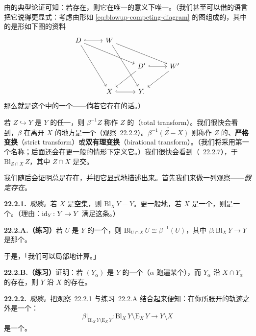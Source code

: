 由\trUniversalProperty{}的典型论证可知：若\trBlowup{}存在，则它在唯一\trIsomorphism{}的意义下唯一。（我们甚至可以借\trYonedaLemma{}的语言把它说得更显式：考虑由形如 \eqref{eq:blowup-competing-diagram} 的图组成的\trCategory，其中的\trMorphism{}是形如下图的资料
\[
\begin{tikzcd}[row sep=2.3em, column sep=2.7em]
D \ar[r,hook] \ar[drr] \ar[ddr] & W \ar[drr] \ar[ddr] & & \\
& & D' \ar[r,hook] \ar[dl] & W' \ar[dl] \\
& X \ar[r,hook] & Y. &
\end{tikzcd}
\]
那么\trBlowup{}就是这个\trCategory{}中的一个\trFinalObject——倘若它存在的话。）

若 $Z\hookrightarrow Y$ 是 $Y$ 的任一\trClosedSubscheme，则\trSchemeTheoreticPreimage{} $\beta^{-1}Z$ 称作 $Z$ 的\textbf{\trTotalTransform}（total transform）。我们很快会看到，$\beta$ 在离开 $X$ 的地方是一个\trIsomorphism（\mbox{观察~22.2.2}）。$\overline{\beta^{-1}(Z-X)}$ 则称作 $Z$ 的\textbf{\trProperTransform}、\textbf{严格变换}（strict transform）或\textbf{双有理变换}（birational transform）。（我们将采用第一个名称；后面还会在更一般的情形下定义它。）我们很快会看到（\mbox{\trBlowupClosureLemma~22.2.7}），\trProperTransform{}\trNaturalIsomorphism{}于 $\mathrm{Bl}_{Z\cap X}\,Z$，其中 $Z\cap X$ 是\trSchemeTheoretic{}交。

我们随后会证明\trBlowup{}总是存在，并把它显式地描述出来。首先我们来做一列观察——\emph{假定\trBlowup{}存在}。

\textbf{22.2.1.}\ \emph{观察。}\quad 若 $X$ 是空集，则 $\mathrm{Bl}_X\,Y=Y$。更一般地，若 $X$ 是一个\trEffectiveCartierDivisor，则\trBlowup{}是一个\trIsomorphism。（理由：$\mathrm{id}_Y\colon Y\to Y$ 满足这条\trUniversalProperty。）

\textbf{22.2.A.（练习）}\quad 若 $U$ 是 $Y$ 的一个\trOpenSubset，则 $\mathrm{Bl}_{U\cap X}\,U\cong\beta^{-1}(U)$，其中 $\beta\colon\mathrm{Bl}_X\,Y\to Y$ 是那个\trBlowup。

于是，「我们可以局部地计算\trBlowup。」

\textbf{22.2.B.（练习）}\quad 证明：若 $(Y_\alpha)$ 是 $Y$ 的一个\trOpenCover（$\alpha$ 跑遍某个\trIndexSet），而 $Y_\alpha$ 沿 $X\cap Y_\alpha$ 的\trBlowup{}存在，则 $Y$ 沿 $X$ 的\trBlowup{}存在。

\textbf{22.2.2.}\ \emph{观察。}\quad 把\mbox{观察~22.2.1} 与\mbox{练习~22.2.A} 结合起来便知：\trBlowup{}在你所胀开的轨迹之外是一个\trIsomorphism：
\[
\beta|_{\mathrm{Bl}_X\,Y\setminus\mathrm{E}_X\,Y}\colon \mathrm{Bl}_X\,Y\setminus\mathrm{E}_X\,Y \longrightarrow Y\setminus X
\]
是一个\trIsomorphism。

